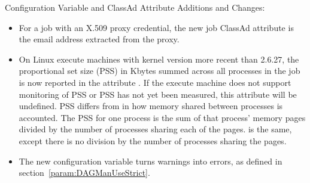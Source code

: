 \noindent Configuration Variable and ClassAd Attribute Additions and Changes:

\begin{itemize}

\item For a job with an X.509 proxy credential, the new job ClassAd
attribute  is the email address extracted
from the proxy.

\item On Linux execute machines with kernel version more recent than 2.6.27,
the proportional set size (PSS) in Kbytes summed across all
processes in the job is now reported in the attribute
.  If the execute machine does not
support monitoring of PSS or PSS has not yet been measured, this
attribute will be undefined.  PSS differs from  in
how memory shared between processes is accounted.  The PSS for one
process is the sum of that process' memory pages divided by the
number of processes sharing each of the pages.   is
the same, except there is no division by the number of processes
sharing the pages.

\item The new configuration variable  
turns warnings into errors, as defined in section~\ref{param:DAGManUseStrict}.


\end{itemize}

